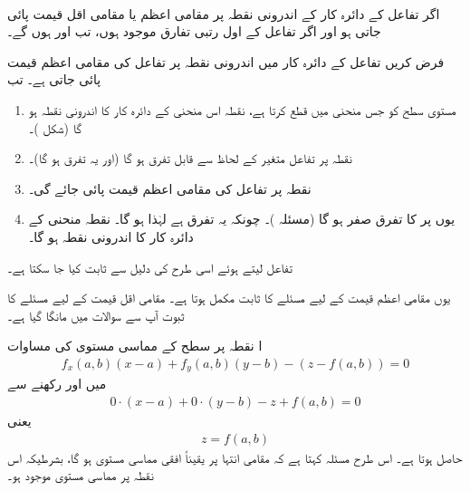 \\
اگر تفاعل  کے دائرہ کار کے اندرونی نقطہ  پر مقامی اعظم یا مقامی  اقل  قیمت پائی جاتی ہو اور اگر تفاعل کے  اول  رتبی تفارق  موجود ہوں، تب  اور  ہوں گے۔ 

فرض کریں تفاعل  کے  دائرہ  کار میں اندرونی نقطہ   پر تفاعل کی مقامی اعظم قیمت  پائی جاتی ہے۔ تب
\begin{enumerate}[1.]
\item
مستوی  سطح  کو جس منحنی  میں قطع کرتا ہے،  نقطہ  اس منحنی کے دائرہ کار کا اندرونی نقطہ ہو گا (شکل )۔
\item
نقطہ  پر تفاعل  متغیر  کے لحاظ سے قابل تفرق ہو گا (اور یہ تفرق  ہو گا)۔
\item
نقطہ  پر تفاعل  کی مقامی اعظم قیمت پائی جائے گی۔  
\item
یوں  پر  کا تفرق صفر ہو گا (مسئلہ )۔ چونکہ یہ تفرق  ہے لہٰذا  ہو گا۔ نقطہ   منحنی    کے دائرہ کار کا اندرونی نقطہ ہو گا۔
\end{enumerate}
تفاعل   لیتے ہوئے اسی طرح کی دلیل سے  ثابت کیا جا سکتا ہے۔

یوں مقامی اعظم قیمت کے لیے مسئلے  کا  ثابت مکمل ہوتا ہے۔ مقامی اقل قیمت کے لیے مسئلے کا ثبوت آپ سے سوالات میں مانگا  گیا ہے۔

ا نقطہ  پر سطح   کے مماسی مستوی  کی مساوات
\begin{align*}
f_x(a,b)(x-a)+f_y(a,b)(y-b)-(z-f(a,b))=0
\end{align*}
میں  اور رکھنے  سے
\begin{align*}
0\cdot(x-a)+0\cdot(y-b)-z+f(a,b)=0
\end{align*}
یعنی
\begin{align*}
z=f(a,b)
\end{align*}
حاصل ہوتا ہے۔ اس طرح مسئلہ  کہتا ہے  کہ مقامی انتہا پر  یقیناً افقی مماسی مستوی ہو گا، بشرطیکہ اس نقطہ پر مماسی مستوی موجود ہو۔

